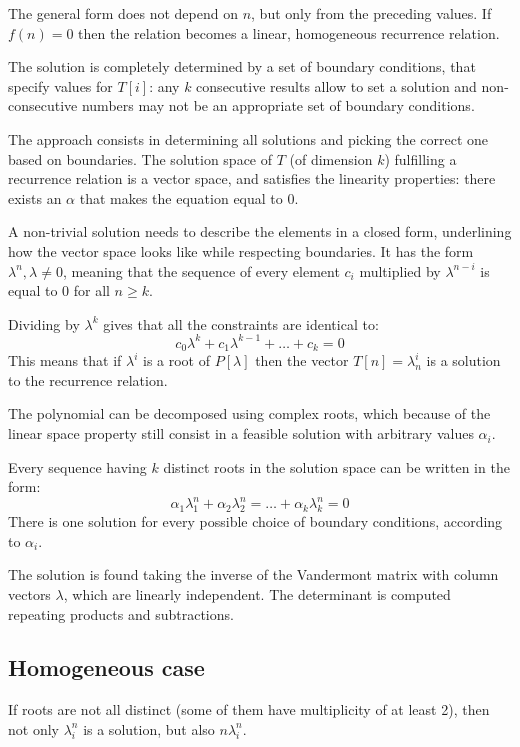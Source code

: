 The general form does not depend on $n$, but only from the preceding values. If $f(n) = 0$ then the relation becomes a linear, homogeneous recurrence relation. 

The solution is completely determined by a set of boundary conditions, that specify values for $T[i]$: any  $k$ consecutive results allow to set a solution and non-consecutive numbers may not be an appropriate set of boundary conditions.

The approach consists in determining all solutions and picking the correct one based on boundaries. The solution space of $T$ (of dimension $k$) fulfilling a recurrence relation is a vector space, and satisfies the linearity properties: there exists an $\alpha$ that makes the equation equal to 0.

A non-trivial solution needs to describe the elements in a closed form, underlining how the vector space looks like while respecting boundaries. It has the form $\lambda^n, \lambda \neq 0$, meaning that the sequence of every element $c_i$ multiplied by $\lambda^{n-i}$ is equal to 0 for all $n \geq k$.

Dividing by $\lambda^k$ gives that all the constraints are identical to:
$$c_0\lambda^k + c_1\lambda^{k-1} + \dots + c_k = 0$$
This means that if $\lambda^i$ is a root of $P[\lambda]$ then the vector $T[n] = \lambda^i_n$ is a solution to the recurrence relation. 

The polynomial can be decomposed using complex roots, which because of the linear space property still consist in a feasible solution with arbitrary values $\alpha_i$. 

Every sequence having $k$ distinct roots in the solution space can be written in the form:
$$\alpha_1\lambda^n_1 + \alpha_2\lambda^n_2 = \dots + \alpha_k\lambda^n_k = 0$$
There is one solution for every possible choice of boundary conditions, according to $\alpha_i$. 

The solution is found taking the inverse of the Vandermont matrix with column vectors $\lambda$, which are linearly independent. The determinant is computed repeating products and subtractions.

\subsection{Homogeneous case}
If roots are not all distinct (some of them have multiplicity of at least 2), then not only $\lambda_i^n$ is a solution, but also $n\lambda_i^n$. 





